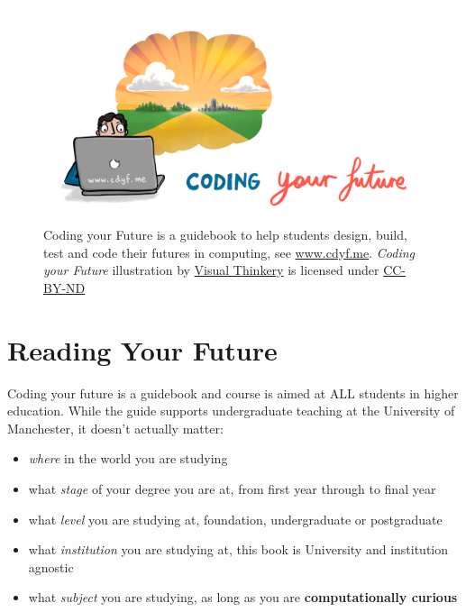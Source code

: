 \documentclass[
  12pt,
]{book}
\providecommand{\tightlist}{%
  \setlength{\itemsep}{0pt}\setlength{\parskip}{0pt}}
\begin{document}
\begin{figure}

{\centering \includegraphics[width=0.98\linewidth]{images/CDYF-vision} 

}

\caption{Coding your Future is a guidebook to help students design, build, test and code their futures in computing, see \href{https://www.cdyf.me}{www.cdyf.me}. \emph{Coding your Future} illustration by \href{https://visualthinkery.com/}{Visual Thinkery} is licensed under \href{https://creativecommons.org/licenses/by-nd/4.0/}{CC-BY-ND}}\label{fig:cdyf-fig}
\end{figure}



\hypertarget{reading}{%
\section{Reading Your Future}\label{reading}}

Coding your future is a guidebook and course is aimed at ALL students in higher education. While the guide supports undergraduate teaching at the University of Manchester, it doesn't actually matter:

\begin{itemize}
\tightlist
\item
  \emph{where} in the world you are studying
\item
  what \emph{stage} of your degree you are at, from first year through to final year
\item
  what \emph{level} you are studying at, foundation, undergraduate or postgraduate
\item
  what \emph{institution} you are studying at, this book is University and institution agnostic
\item
  what \emph{subject} you are studying, as long as you are \textbf{computationally curious}
\end{itemize}
\end{document}

